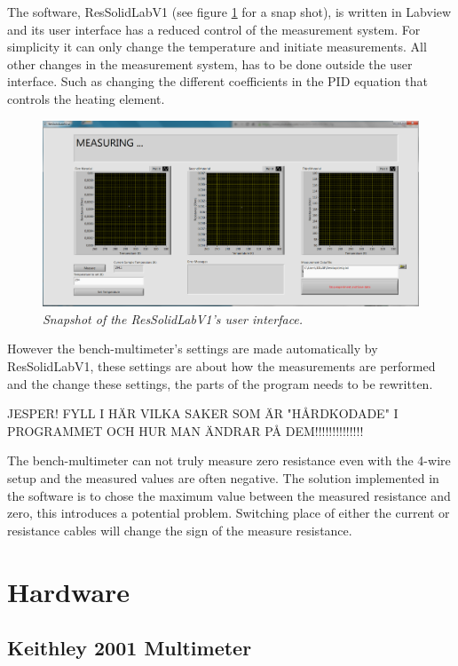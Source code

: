 \documentclass[a4paper,12pt]{article}
\begin{document}
The software, ResSolidLabV1 (see figure \ref{fig:UI} for a snap shot), is written in Labview and its user interface has a reduced control of the measurement system. For simplicity it can only change the temperature and initiate measurements. All other changes in the measurement system, has to be done outside the user interface. Such as changing the different coefficients in the PID equation that controls the heating element. 


\begin{figure}[H]
\center
\includegraphics[width=1\textwidth]{ResSolidLabV1UI.PNG}
\caption{\emph{Snapshot of the ResSolidLabV1's user interface.}}
\label{fig:UI}
\end{figure}

However the bench-multimeter's settings are made automatically by ResSolidLabV1, these settings are about how the measurements are performed and the change these settings, the parts of the program needs to be rewritten.

JESPER! FYLL I HÄR VILKA SAKER SOM ÄR "HÅRDKODADE" I PROGRAMMET OCH HUR MAN ÄNDRAR PÅ DEM!!!!!!!!!!!!!!

The  bench-multimeter can not truly measure zero resistance even with the 4-wire setup and the measured values are often negative. The solution implemented in the software is to chose the maximum value between the measured resistance and zero, this introduces a potential problem. Switching place of either the current or resistance cables will change the sign of the measure resistance.


\section{Hardware}

\subsection{Keithley 2001 Multimeter}
\end{document}
